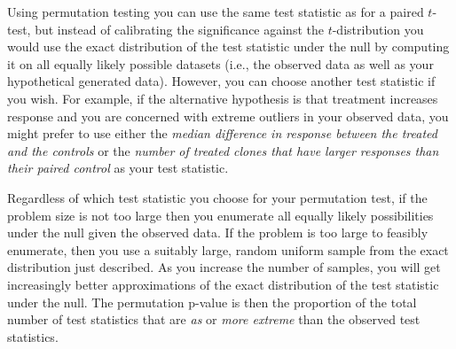 \begin{example}[label=exa:cont]
Using permutation testing you can use the same test statistic as for
a paired $t$-test, but instead of calibrating the significance against the
$t$-distribution you would use the exact distribution of the test statistic
under the null by computing it on all equally likely possible datasets (i.e.,
the observed data as well as your hypothetical generated data).  However, you
can choose another test statistic if you wish.  For example, if the alternative
hypothesis is that treatment increases response and you are concerned with
extreme outliers in your observed data, you might prefer to use either the
\emph{median difference in response between the treated and the controls} or
the \emph{number of treated clones that have larger responses than their
paired control} as your test statistic.

Regardless of which test statistic you choose for your permutation test, if the
problem size is not too large then you enumerate all equally likely
possibilities under the null given the observed data.  If the problem is too
large to feasibly enumerate, then you use a suitably large, random uniform
sample from the exact distribution just described.  As you increase the number
of samples, you will get increasingly better approximations of the exact
distribution of the test statistic under the null.  The permutation p-value is
then the proportion of the total number of test statistics that are \emph{as}
or \emph{more extreme} than the observed test statistics.  \end{example}

